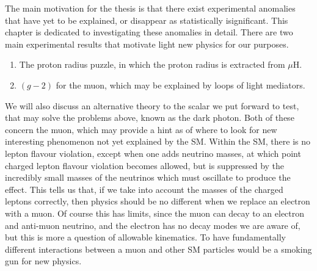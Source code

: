 \label{chapter:review}

The main motivation for the thesis is that there exist experimental anomalies that have yet to be explained, or disappear as statistically isignificant.
This chapter is dedicated to investigating these anomalies in detail.
There are two main experimental results that motivate light new physics for our purposes.

\begin{enumerate}
    \item The proton radius puzzle, in which the proton radius is extracted from $\mu\textrm{H}$.
    \item $(g-2)$ for the muon, which may be explained by loops of light mediators.
\end{enumerate}

We will also discuss an alternative theory to the scalar we put forward to test, that may solve the problems above, known as the dark photon.
Both of these concern the muon, which may provide a hint as of where to look for new interesting phenomenon not yet explained by the SM.
Within the SM, there is no lepton flavour violation, except when one adds neutrino masses, at which point charged lepton flavour violation becomes allowed, but is suppressed by the incredibly small masses of the neutrinos which must oscillate to produce the effect.
This tells us that, if we take into account the masses of the charged leptons correctly, then physics should be no different when we replace an electron with a muon.
Of course this has limits, since the muon can decay to an electron and anti-muon neutrino, and the electron has no decay modes we are aware of, but this is more a question of allowable kinematics.
To have fundamentally different interactions between a muon and other SM particles would be a smoking gun for new physics.



